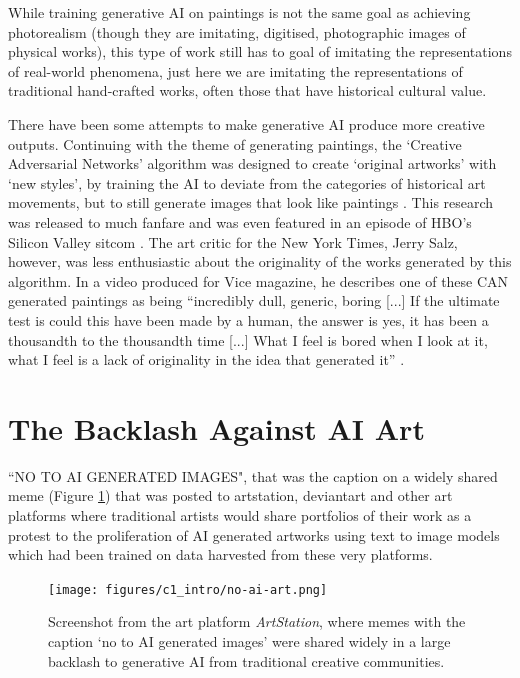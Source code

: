 While training generative AI on paintings is not the same goal as achieving photorealism (though they are imitating, digitised, photographic images of physical works), this type of work still has to goal of imitating the representations of real-world phenomena, just here we are imitating the representations of traditional hand-crafted works, often those that have historical cultural value.

There have been some attempts to make generative AI produce more creative outputs. 
Continuing with the theme of generating paintings, the ‘Creative Adversarial Networks’ algorithm was designed to create ‘original artworks’ with ‘new styles’, by training the AI to deviate from the categories of historical art movements, but to still generate images that look like paintings \cite{elgammal2017can}. 
This research was released to much fanfare and was even featured in an episode of HBO’s Silicon Valley sitcom \citep{elhoseiny2019hbo}. 
The art critic for the New York Times, Jerry Salz, however, was less enthusiastic about the originality of the works generated by this algorithm. 
In a video produced for Vice magazine, he describes one of these CAN generated paintings as being “incredibly dull, generic, boring [...] If the ultimate test is could this have been made by a human, the answer is yes, it has been a thousandth to the thousandth time [...] What I feel is bored when I look at it, what I feel is a lack of originality in the idea that generated it” \citep{saltz2018aiart}. 

\section{The Backlash Against AI Art}

``NO TO AI GENERATED IMAGES", that was the caption on a widely shared meme (Figure \ref{fig:c1:no-ai-art}) that was posted to artstation, deviantart and other art platforms where traditional artists would share portfolios of their work as a protest to the proliferation of AI generated artworks using text to image models which had been trained on data harvested from these very platforms. 

\begin{figure}[!htb]
    \centering
    \captionsetup{justification=centering}
    \texttt{[image: figures/c1\_intro/no-ai-art.png]}
    \caption{Screenshot from the art platform \textit{ArtStation}, where memes with the caption `no to AI generated images' were shared widely in a large backlash to generative AI from traditional creative communities.}
    \label{fig:c1:no-ai-art}
\end{figure}

